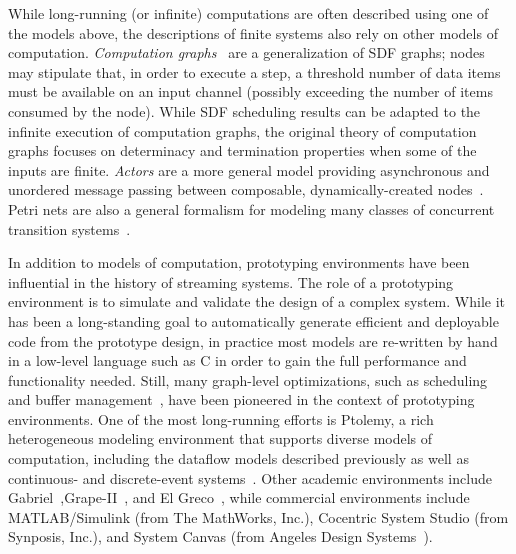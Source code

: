 While long-running (or infinite) computations are often described
using one of the models above, the descriptions of finite systems also
rely on other models of computation.  {\it Computation
  graphs}~\cite{karp_properties_1966} are a generalization of SDF
graphs; nodes may stipulate that, in order to execute a step, a
threshold number of data items must be available on an input channel
(possibly exceeding the number of items consumed by the node).  While
SDF scheduling results can be adapted to the infinite execution of
computation graphs, the original theory of computation graphs focuses
on determinacy and termination properties when some of the inputs are
finite.  {\it Actors} are a more general model providing asynchronous
and unordered message passing between composable, dynamically-created
nodes~\cite{hewitt_universal_1973,greif_semantics_1975,clinger_foundations_1981,agha_actors:model_1985}.
Petri nets are also a general formalism for modeling many classes of
concurrent transition
systems~\cite{petri_communication_1962,murata_petri_1989}.

In addition to models of computation, prototyping environments have
been influential in the history of streaming systems.  The role of a
prototyping environment is to simulate and validate the design of a
complex system.  While it has been a long-standing goal to
automatically generate efficient and deployable code from the
prototype design, in practice most models are re-written by hand in a
low-level language such as C in order to gain the full performance and
functionality needed.  Still, many graph-level optimizations, such as
scheduling~\cite{TODO-could-come-from-Ko-et-al-phases-intro} and
buffer management~\cite{TODO}, have been pioneered in the context of
prototyping environments.  One of the most long-running efforts is
Ptolemy, a rich heterogeneous modeling environment that supports
diverse models of computation, including the dataflow models described
previously as well as continuous- and discrete-event
systems~\cite{buck_multirate_1991,eker_taming_2003}.  Other academic
environments include
Gabriel~\cite{lee_gabriel:design_1989},Grape-II~\cite{lauwereins_grape-ii:system-level_1995},
and El Greco~\cite{buck_heterogeneous_2000}, while commercial
environments include MATLAB/Simulink (from The MathWorks, Inc.),
Cocentric System Studio (from Synposis, Inc.), and System
Canvas (from Angeles Design Systems~\cite{murthy_system_2001}).



